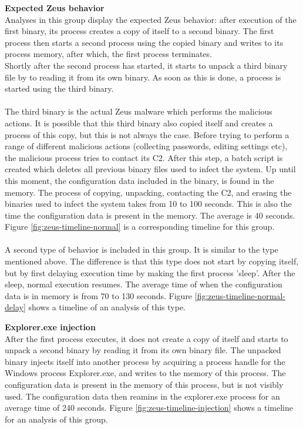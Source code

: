 \documentclass[conference]{IEEEtran}
\begin{document}
\newpage
\textbf{Expected Zeus behavior}
\\Analyses in this group display the expected Zeus behavior: \cite{wyke-zeus} after execution of the first binary, its process creates a copy of itself to a second binary. The first process then starts a second process using the copied binary and writes to its process memory, after which, the first process terminates.\\ Shortly after the second process has started, it starts to unpack a third binary file by to reading it from its own binary. As soon as this is done, a process is started using the third binary.
\\\\The third binary is the actual Zeus malware which performs the malicious actions. It is possible that this third binary also copied itself and creates a process of this copy, but this is not always the case. Before trying to perform a range of different malicious actions (collecting passwords, editing settings etc), the malicious process tries to contact its C2. After this step, a batch script is created which deletes all previous binary files used to infect the system. Up until this moment, the configuration data included in the binary, is found in the memory. The process of copying, unpacking, contacting the C2, and erasing the binaries used to infect the system takes from 10 to 100 seconds. This is also the time the configuration data is present in the memory. The average is 40 seconds.  Figure \ref{fig:zeus-timeline-normal} is a corresponding timeline for this group. \\\\A second type of behavior is included in this group. It is similar to the type mentioned above. The difference is that this type does not start by copying itself, but by first delaying execution time by making the first process 'sleep'. After the sleep, normal execution resumes. The average time of when the configuration data is in memory is from 70 to 130 seconds. Figure \ref{fig:zeus-timeline-normal-delay} shows a timeline of an analysis of this type.


\newpage

\textbf{Explorer.exe injection}
\\After the first process executes, it does not create a copy of itself and starts to unpack a second binary by reading it from its own binary file. The unpacked binary injects itself into another process by acquiring a process handle for the Windows process Explorer.exe, and writes to the memory of this process. The configuration data is present in the memory of this process, but is not visibly used. The configuration data then reamins in the explorer.exe process for an average time of 240 seconds. Figure \ref{fig:zeus-timeline-injection} shows a timeline for an analysis of this group.\\
\end{document}
